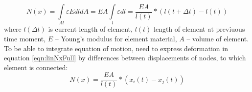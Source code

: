 \begin{equation}\label{eqn:linNxFull}
  N(x)= \int\limits_{Al} \varepsilon EdldA=EA\int\limits_l \varepsilon dl=\frac{EA}{l(t)}*(l(t + \Delta t)-l(t))
\end{equation}
where $l(\Delta t)$ is current length of element, $l(t)$ length of element at previuous time moment,
$E$ – Young’s modulus for element material, $A$ – volume of element. To be able to integrate
equation of motion, need to express deformation in equation \eqref{eqn:linNxFull} by differences
between displacements of nodes, to which element is connected:
\begin{equation}\label{eqn:linNxWdispl}
  N(x)=\frac{EA}{l(t)}*(x_{i}(t)-x_{j}(t))
\end{equation}\par

